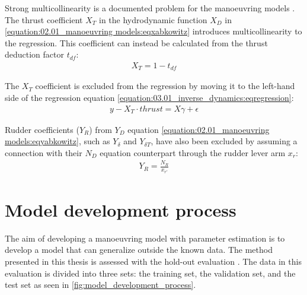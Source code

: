 Strong multicollinearity is a documented problem for the manoeuvring models \cite{luo_parameter_2016, wang_quantifying_2018}.
The thrust coefficient \(X_T\) in the hydrodynamic function \(X_D\) in \autoref{equation:02.01_manoeuvring models:eqxabkowitz} introduces multicollinearity to the regression. This coefficient can instead be calculated from the thrust deduction factor \(t_{df}\):
\begin{equation}\label{equation:03.01_inverse_dynamics:eqXthrust}
\begin{split}\displaystyle X_{T} = 1 - t_{df}\end{split}
\end{equation}

\noindent The \(X_T\) coefficient is excluded from the regression by moving it to the left-hand side of the regression equation \autoref{equation:03.01_inverse_dynamics:eqregression}:
\begin{equation}\label{equation:03.01_inverse_dynamics:eqexclude}
\begin{split}y-X_T \cdot thrust = X \gamma + \epsilon\end{split}
\end{equation}

\noindent Rudder coefficients (\(Y_R\)) from \(Y_D\) equation \autoref{equation:02.01_manoeuvring models:eqyabkowitz}, such as \(Y_{\delta}\) and \(Y_{\delta T}\), have also been excluded by assuming a connection with their \(N_D\) equation counterpart through the rudder lever arm \(x_r\):
\begin{equation}\label{equation:03.01_inverse_dynamics:eqyr}
\begin{split}\displaystyle Y_{R} = \frac{N_{R}}{x_{r'}}\end{split}
\end{equation}

\section{Model development process}
\label{sec:model_development_process}
The aim of developing a manoeuvring model with parameter estimation is to develop a model that can generalize outside the known data. The method presented in this thesis is assessed with the hold-out evaluation \cite{sammut_holdout_2017}. The data in this evaluation is divided into three sets: the training set, the validation set, and the test set as seen in \autoref{fig:model_development_process}.

